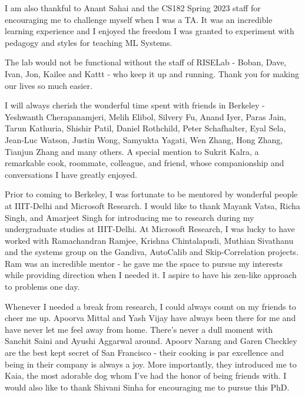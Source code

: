 \begin{acknowledgements}
I am also thankful to Anant Sahai and the CS182 Spring 2023 staff for encouraging me to challenge myself when I was a TA. It was an incredible learning experience and I enjoyed the freedom I was granted to experiment with pedagogy and styles for teaching ML Systems.

The lab would not be functional without the staff of RISELab - Boban, Dave, Ivan, Jon, Kailee and Kattt - who keep it up and running. Thank you for making our lives so much easier.

I will always cherish the wonderful time spent with friends in Berkeley - Yeshwanth Cherapanamjeri, Melih Elibol, Silvery Fu, Anand Iyer, Paras Jain, Tarun Kathuria, Shishir Patil, Daniel Rothchild, Peter Schafhalter, Eyal Sela, Jean-Luc Watson, Justin Wong, Samyukta Yagati, Wen Zhang, Hong Zhang, Tianjun Zhang and many others. A special mention to Sukrit Kalra, a remarkable cook, roommate, colleague, and friend, whose companionship and conversations I have greatly enjoyed.

Prior to coming to Berkeley, I was fortunate to be mentored by wonderful people at IIIT-Delhi and Microsoft Research. I would like to thank Mayank Vatsa, Richa Singh, and Amarjeet Singh for introducing me to research during my undergraduate studies at IIIT-Delhi. At Microsoft Research, I was lucky to have worked with Ramachandran Ramjee, Krishna Chintalapudi, Muthian Sivathanu and the systems group on the Gandiva, AutoCalib and Skip-Correlation projects. Ram was an incredible mentor - he gave me the space to pursue my interests while providing direction when I needed it. I aspire to have his zen-like approach to problems one day. 

Whenever I needed a break from research, I could always count on my friends to cheer me up. Apoorva Mittal and Yash Vijay have always been there for me and have never let me feel away from home. There's never a dull moment with Sanchit Saini and Ayushi Aggarwal around. Apoorv Narang and Garen Checkley are the best kept secret of San Francisco - their cooking is par excellence and being in their company is always a joy. More importantly, they introduced me to Kaia, the most adorable dog whom I've had the honor of being friends with. 
I would also like to thank Shivani Sinha for encouraging me to pursue this PhD.


\end{acknowledgements}
